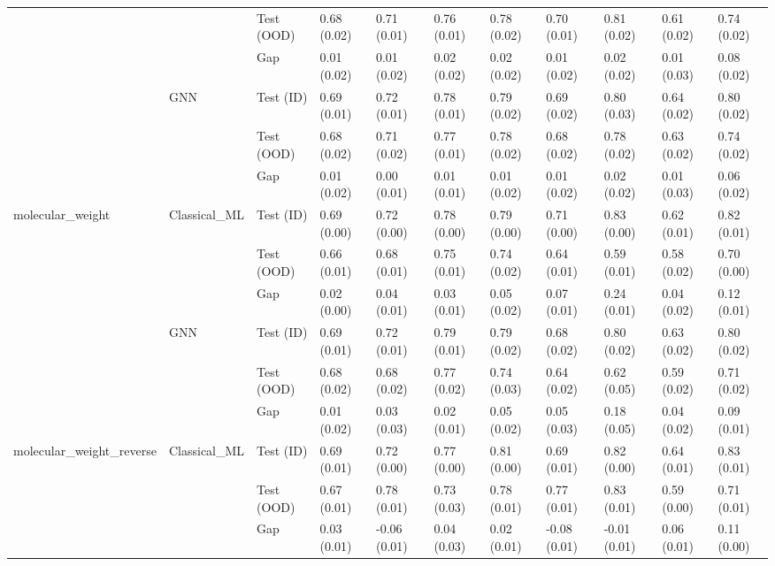 \begin{tabular}{lllllllllll}
 &  & Test (OOD) & 0.68 (0.02) & 0.71 (0.01) & 0.76 (0.01) & 0.78 (0.02) & 0.70 (0.01) & 0.81 (0.02) & 0.61 (0.02) & 0.74 (0.02) \\
 &  & Gap & 0.01 (0.02) & 0.01 (0.02) & 0.02 (0.02) & 0.02 (0.02) & 0.01 (0.02) & 0.02 (0.02) & 0.01 (0.03) & 0.08 (0.02) \\
\cline{2-11}
 & \multirow[t]{3}{*}{GNN} & Test (ID) & 0.69 (0.01) & 0.72 (0.01) & 0.78 (0.01) & 0.79 (0.02) & 0.69 (0.02) & 0.80 (0.03) & 0.64 (0.02) & 0.80 (0.02) \\
 &  & Test (OOD) & 0.68 (0.02) & 0.71 (0.02) & 0.77 (0.01) & 0.78 (0.02) & 0.68 (0.02) & 0.78 (0.02) & 0.63 (0.02) & 0.74 (0.02) \\
 &  & Gap & 0.01 (0.02) & 0.00 (0.01) & 0.01 (0.01) & 0.01 (0.02) & 0.01 (0.02) & 0.02 (0.02) & 0.01 (0.03) & 0.06 (0.02) \\
\cline{1-11} \cline{2-11}
\multirow[t]{6}{*}{molecular_weight} & \multirow[t]{3}{*}{Classical_ML} & Test (ID) & 0.69 (0.00) & 0.72 (0.00) & 0.78 (0.00) & 0.79 (0.00) & 0.71 (0.00) & 0.83 (0.00) & 0.62 (0.01) & 0.82 (0.01) \\
 &  & Test (OOD) & 0.66 (0.01) & 0.68 (0.01) & 0.75 (0.01) & 0.74 (0.02) & 0.64 (0.01) & 0.59 (0.01) & 0.58 (0.02) & 0.70 (0.00) \\
 &  & Gap & 0.02 (0.00) & 0.04 (0.01) & 0.03 (0.01) & 0.05 (0.02) & 0.07 (0.01) & 0.24 (0.01) & 0.04 (0.02) & 0.12 (0.01) \\
\cline{2-11}
 & \multirow[t]{3}{*}{GNN} & Test (ID) & 0.69 (0.01) & 0.72 (0.01) & 0.79 (0.01) & 0.79 (0.02) & 0.68 (0.02) & 0.80 (0.02) & 0.63 (0.02) & 0.80 (0.02) \\
 &  & Test (OOD) & 0.68 (0.02) & 0.68 (0.02) & 0.77 (0.02) & 0.74 (0.03) & 0.64 (0.02) & 0.62 (0.05) & 0.59 (0.02) & 0.71 (0.02) \\
 &  & Gap & 0.01 (0.02) & 0.03 (0.03) & 0.02 (0.01) & 0.05 (0.02) & 0.05 (0.03) & 0.18 (0.05) & 0.04 (0.02) & 0.09 (0.01) \\
\cline{1-11} \cline{2-11}
\multirow[t]{6}{*}{molecular_weight_reverse} & \multirow[t]{3}{*}{Classical_ML} & Test (ID) & 0.69 (0.01) & 0.72 (0.00) & 0.77 (0.00) & 0.81 (0.00) & 0.69 (0.01) & 0.82 (0.00) & 0.64 (0.01) & 0.83 (0.01) \\
 &  & Test (OOD) & 0.67 (0.01) & 0.78 (0.01) & 0.73 (0.03) & 0.78 (0.01) & 0.77 (0.01) & 0.83 (0.01) & 0.59 (0.00) & 0.71 (0.01) \\
 &  & Gap & 0.03 (0.01) & -0.06 (0.01) & 0.04 (0.03) & 0.02 (0.01) & -0.08 (0.01) & -0.01 (0.01) & 0.06 (0.01) & 0.11 (0.00) \\

\end{tabular}
